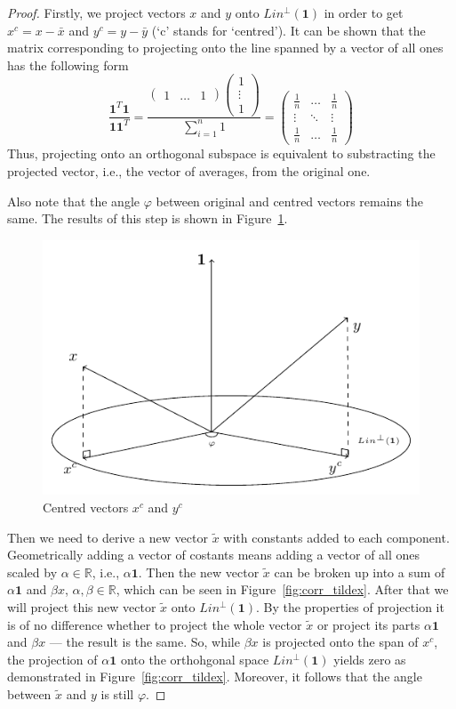 \begin{proof}
Firstly, we project vectors $x$ and $y$ onto $Lin^{\perp}(\mathbf{1})$ in order to get $x^c = x - \bar x$ and $y^c = y - \bar y$
(`c' stands for `centred'). It can be shown that the matrix corresponding to projecting onto the line spanned by a vector of all ones has the following form
\[
\frac{\mathbf{1}^T \mathbf{1}}{\mathbf{1} \mathbf{1}^T} = \frac{\begin{pmatrix} 1 & \ldots & 1 \end{pmatrix} \begin{pmatrix} 1 \\ \vdots \\ 1 \end{pmatrix}}{\sum_{i=1}^n 1} = \begin{pmatrix} \frac{1}{n} & \ldots & \frac{1}{n} \\ \vdots & \ddots & \vdots \\ \frac{1}{n} & \ldots & \frac{1}{n} \end{pmatrix}
\]
Thus, projecting onto an orthogonal subspace is equivalent to substracting the projected vector, i.e., the vector of averages, from the original one.

Also note that the angle $\varphi$ between original and centred vectors remains the same.
The results of this step is shown in Figure~\ref{fig:corr_xyc}.

\begin{figure}[h!]
  \centering
  \includegraphics[width=0.45\linewidth]{figures/02_correlation_constant_centered_variables.pdf}
  \caption{Centred vectors $x^c$ and $y^c$}
  \label{fig:corr_xyc}
\end{figure}

Then we need to derive a new vector $\tilde x$ with constants added to each component.
Geometrically adding a vector of costants means adding a vector of all ones
scaled by $\alpha \in \mathbb{R}$, i.e., $\alpha \mathbf{1}$.
Then the new vector $\tilde x$ can be broken up into a sum of $\alpha \mathbf{1}$ and
$\beta x$, $\alpha, \beta \in \mathbb{R}$, which can be seen in Figure~\ref{fig:corr_tildex}.
After that we will project this new vector $\tilde x$ onto $Lin^{\perp}(\mathbf{1})$.
By the properties of projection it is of no difference whether to project
the whole vector $\tilde x$ or project its parts $\alpha \mathbf{1}$
and $\beta x$ — the result is the same.
So, while $\beta x$ is projected onto the span of $x^c$, the projection of $\alpha \mathbf{1}$
onto the orthohgonal space $Lin^{\perp}(\mathbf{1})$ yields zero as demonstrated
in Figure~\ref{fig:corr_tildex}.
Moreover, it follows that the angle between $\tilde x$ and $y$ is still $\varphi$.


\end{proof}
